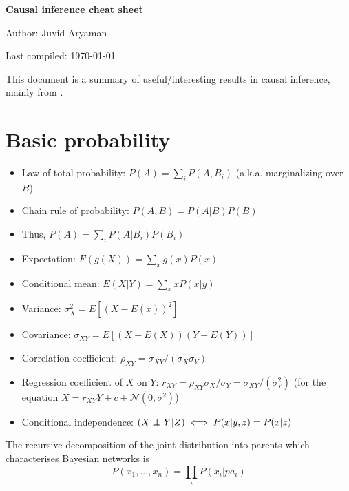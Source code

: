 \documentclass[11pt]{article}
\numberwithin{equation}{section}
\newcommand\indep{\protect\mathpalette{\protect\independenT}{\perp}}
\def\independenT#1#2{\mathrel{\rlap{$#1#2$}\mkern2mu{#1#2}}}
\begin{document}
\begin{flushleft}
\textbf{\Large Causal inference cheat sheet}
\end{flushleft}

\begin{flushleft}
Author: Juvid Aryaman

Last compiled: \today
\end{flushleft}

\noindent This document is a summary of useful/interesting results in causal inference, mainly from \cite{pearl09}.


\section{Basic probability}

\begin{itemize}[noitemsep]
\item Law of total probability: $P(A) = \sum_i P(A, B_i)$ (a.k.a. marginalizing over $B$)
\item Chain rule of probability: $P(A,B) = P(A|B) P(B)$
\item Thus, $P(A) = \sum_i P(A|B_i) P(B_i)$
\item Expectation: $E(g(X)) = \sum_x g(x) P(x)$
\item Conditional mean: $E(X|Y) = \sum_x x P(x|y)$
\item Variance: $\sigma_X^2 = E[(X - E(x))^2]$
\item Covariance: $\sigma_{XY} = E[(X-E(X))(Y-E(Y))]$
\item Correlation coefficient: $\rho_{XY}=\sigma_{XY}/(\sigma_X \sigma_Y)$
\item Regression coefficient of $X$ on $Y$: $r_{XY} = \rho_{XY} \sigma_X/\sigma_Y = \sigma_{XY}/(\sigma_Y^2)$ (for the equation $X = r_{XY} Y + c + \mathcal{N}(0, \sigma^2)$)
\item Conditional independence: $(X \indep Y | Z) \iff P(x|y,z) = P(x|z) $
\end{itemize}

The recursive decomposition of the joint distribution into parents which characterises Bayesian networks is
\begin{equation}
P(x_1, ..., x_n) = \prod_i P(x_i|pa_i) \label{eq:bayes-net-char}
\end{equation}
\end{document}
